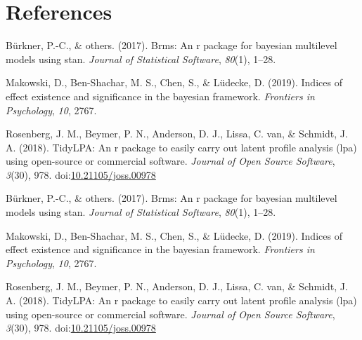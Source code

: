 \documentclass[man]{apa6}
\begin{document}
\newpage

\hypertarget{references}{%
\section{References}\label{references}}

\begingroup
\setlength{\parindent}{-0.5in}
\setlength{\leftskip}{0.5in}

\hypertarget{refs}{}
\leavevmode\hypertarget{ref-burkner2017}{}%
Bürkner, P.-C., \& others. (2017). Brms: An r package for bayesian multilevel models using stan. \emph{Journal of Statistical Software}, \emph{80}(1), 1--28.

\leavevmode\hypertarget{ref-makowski2019}{}%
Makowski, D., Ben-Shachar, M. S., Chen, S., \& Lüdecke, D. (2019). Indices of effect existence and significance in the bayesian framework. \emph{Frontiers in Psychology}, \emph{10}, 2767.

\leavevmode\hypertarget{ref-R-tidyLPA}{}%
Rosenberg, J. M., Beymer, P. N., Anderson, D. J., Lissa, C. van, \& Schmidt, J. A. (2018). TidyLPA: An r package to easily carry out latent profile analysis (lpa) using open-source or commercial software. \emph{Journal of Open Source Software}, \emph{3}(30), 978. doi:\href{https://doi.org/10.21105/joss.00978}{10.21105/joss.00978}

\leavevmode\hypertarget{ref-burkner2017}{}%
Bürkner, P.-C., \& others. (2017). Brms: An r package for bayesian multilevel models using stan. \emph{Journal of Statistical Software}, \emph{80}(1), 1--28.

\leavevmode\hypertarget{ref-makowski2019}{}%
Makowski, D., Ben-Shachar, M. S., Chen, S., \& Lüdecke, D. (2019). Indices of effect existence and significance in the bayesian framework. \emph{Frontiers in Psychology}, \emph{10}, 2767.

\leavevmode\hypertarget{ref-R-tidyLPA}{}%
Rosenberg, J. M., Beymer, P. N., Anderson, D. J., Lissa, C. van, \& Schmidt, J. A. (2018). TidyLPA: An r package to easily carry out latent profile analysis (lpa) using open-source or commercial software. \emph{Journal of Open Source Software}, \emph{3}(30), 978. doi:\href{https://doi.org/10.21105/joss.00978}{10.21105/joss.00978}

\endgroup
\end{document}
